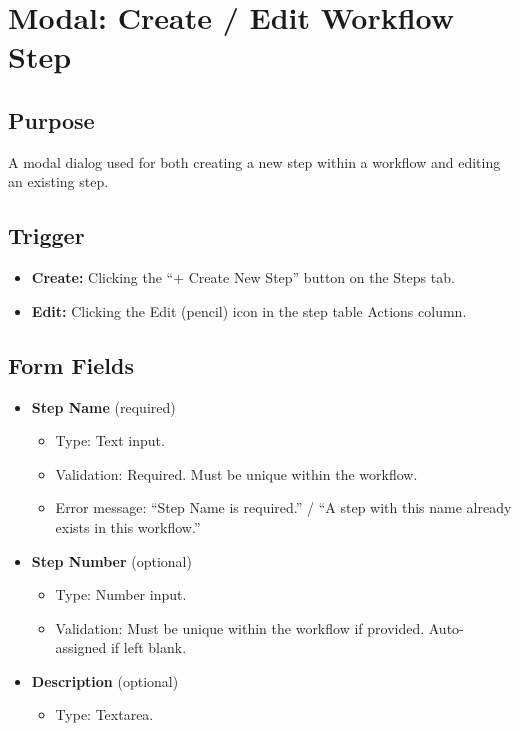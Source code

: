 \documentclass[12pt]{article}
\begin{document}
\section{Modal: Create / Edit Workflow Step}

\subsection{Purpose}
A modal dialog used for both creating a new step within a workflow and editing an existing
step.

\subsection{Trigger}
\begin{itemize}
    \item \textbf{Create:} Clicking the ``+ Create New Step'' button on the Steps tab.
    \item \textbf{Edit:} Clicking the Edit (pencil) icon in the step table Actions column.
\end{itemize}

\subsection{Form Fields}
\begin{itemize}
    \item \textbf{Step Name} (required)
    \begin{itemize}
        \item Type: Text input.
        \item Validation: Required. Must be unique within the workflow.
        \item Error message: ``Step Name is required.'' / ``A step with this name already
        exists in this workflow.''
    \end{itemize}
    \item \textbf{Step Number} (optional)
    \begin{itemize}
        \item Type: Number input.
        \item Validation: Must be unique within the workflow if provided. Auto-assigned if
        left blank.
    \end{itemize}
    \item \textbf{Description} (optional)
    \begin{itemize}
        \item Type: Textarea.
    \end{itemize}
\end{itemize}
\end{document}

